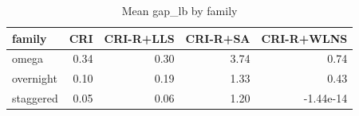 \begin{table}[htbp]
\centering
\small
\caption{Mean gap\_lb by family}
\label{tab:E5b_ablation_60s_b60_by_family}
\begin{tabular}{lrrrr}
\toprule
family & CRI & CRI-R+LLS & CRI-R+SA & CRI-R+WLNS \\
\midrule
omega & 0.34 & 0.30 & 3.74 & 0.74 \\
overnight & 0.10 & 0.19 & 1.33 & 0.43 \\
staggered & 0.05 & 0.06 & 1.20 & -1.44e-14 \\
\bottomrule
\end{tabular}
\end{table}
